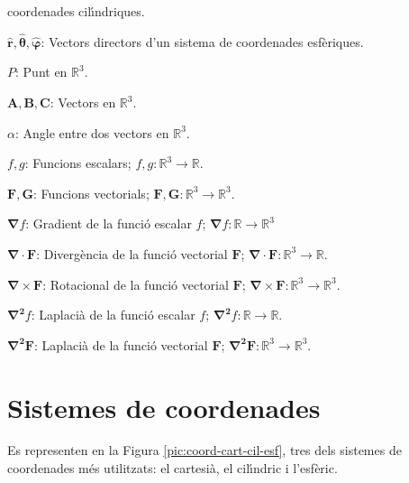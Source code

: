 \documentclass[catalan,a4paper,twoside,11pt]{article}
\begin{document}
\begin{list}{}
   coordenades cil\'{\i}ndriques.
   \item[$\boldsymbol{\hat{r}},\boldsymbol{\hat{\theta}},\boldsymbol{\hat{\varphi}}$:] Vectors directors d'un sistema de
   coordenades esf\`{e}riques.
   \item[$P$:] Punt en $\mathbb{R}^3$.
   \item[$\boldsymbol{A,B,C}$:] Vectors en $\mathbb{R}^3$.
   \item[$\alpha$:] Angle entre dos vectors en $\mathbb{R}^3$.
   \item[$f,g$:] Funcions escalars; $f,g: \mathbb{R}^3\rightarrow\mathbb{R}$.
   \item[$\boldsymbol{F,G}$:] Funcions vectorials; $\boldsymbol{F,G}:\mathbb{R}^3\rightarrow\mathbb{R}^3$.
   \item[$\boldsymbol{\nabla}f$:] Gradient de la funci\'{o} escalar $f$;
   $\boldsymbol{\nabla}f:\mathbb{R}\rightarrow\mathbb{R}^3$
   \item[$\boldsymbol{\nabla\cdot F}$:] Diverg\`{e}ncia de la funci\'{o} vectorial $\boldsymbol{F}$;
   $\boldsymbol{\nabla\cdot F}: \mathbb{R}^3\rightarrow\mathbb{R}$.
   \item[$\boldsymbol{\nabla\times F}$:] Rotacional de la funci\'{o} vectorial $\boldsymbol{F}$;
   $\boldsymbol{\nabla\times F}:
   \mathbb{R}^3\rightarrow\mathbb{R}^3$.
   \item[$\boldsymbol{\nabla^2}f$:] Laplaci\`{a} de la funci\'{o} escalar $f$;
   $\boldsymbol{\nabla^2}f: \mathbb{R}\rightarrow\mathbb{R}$.
   \item[$\boldsymbol{\nabla^2F}$:] Laplaci\`{a} de la funci\'{o} vectorial $\boldsymbol{F}$; $\boldsymbol{\nabla^2F}: \mathbb{R}^3\rightarrow\mathbb{R}^3$.
\end{list}

\newcommand{\va}{\ensuremath{\,\boldsymbol{\hat{\imath}}}}
\newcommand{\vb}{\ensuremath{\,\boldsymbol{\hat{\jmath}}}}
\newcommand{\vc}{\ensuremath{\,\boldsymbol{\hat{k}}}}
\section{Sistemes de coordenades}

Es representen en la Figura \vref{pic:coord-cart-cil-esf}, tres dels
sistemes de coordenades m\'{e}s utilitzats: el cartesi\`{a}, el
cil\'{\i}ndric i l'esf\`{e}ric.
\end{document}
